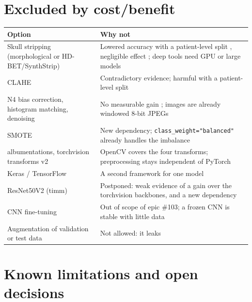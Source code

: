 \documentclass[11pt,a4paper]{article}
\newcommand{\board}[1]{\textsf{\##1}}
\begin{document}
\section{Excluded by cost/benefit}

\begin{center}
\begin{tabularx}{\textwidth}{@{}p{4.6cm} L@{}}
\toprule
Option & Why not \\
\midrule
Skull stripping (morphological or HD-BET/SynthStrip) & Lowered accuracy with a patient-level split \cite{r6}, negligible effect \cite{r7}; deep tools need GPU or large models \\
CLAHE & Contradictory evidence; harmful with a patient-level split \cite{r6} \\
N4 bias correction, histogram matching, denoising & No measurable gain \cite{r7}; images are already windowed 8-bit JPEGs \\
SMOTE & New dependency; \texttt{class\_weight="balanced"} already handles the imbalance \cite{r12} \\
albumentations, torchvision transforms v2 & OpenCV covers the four transforms; preprocessing stays independent of PyTorch \\
Keras / TensorFlow & A second framework for one model \\
ResNet50V2 (timm) & Postponed: weak evidence of a gain over the torchvision backbones, and a new dependency \\
CNN fine-tuning & Out of scope of epic \board{103}; a frozen CNN is stable with little data \cite{r10} \\
Augmentation of validation or test data & Not allowed: it leaks \cite{r4} \\
\bottomrule
\end{tabularx}
\end{center}

\section{Known limitations and open decisions}
\end{document}
